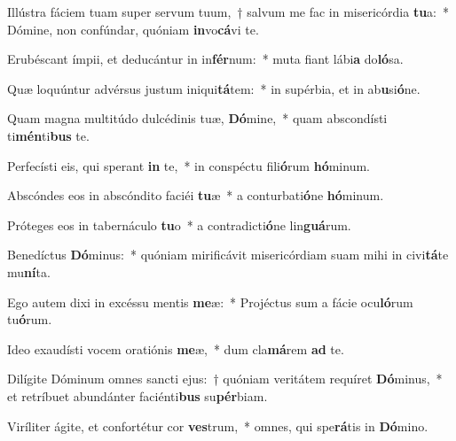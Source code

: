 \item Illústra fáciem tuam super servum tuum,~† salvum me fac in misericórdia \textbf{tu}a:~* Dómine, non confúndar, quóniam \textbf{in}vo\textbf{cá}vi te.
\item Erubéscant ímpii, et deducántur in in\textbf{fér}num:~* muta fiant lábi\textbf{a} do\textbf{ló}sa.
\item Quæ loquúntur advérsus justum iniqui\textbf{tá}tem:~* in supérbia, et in ab\textbf{u}si\textbf{ó}ne.
\item Quam magna multitúdo dulcédinis tuæ, \textbf{Dó}mine,~* quam abscondísti ti\textbf{mén}ti\textbf{bus} te.
\item Perfecísti eis, qui sperant \textbf{in} te,~* in conspéctu fili\textbf{ó}rum \textbf{hó}minum.
\item Abscóndes eos in abscóndito faciéi \textbf{tu}æ~* a conturbati\textbf{ó}ne \textbf{hó}minum.
\item Próteges eos in tabernáculo \textbf{tu}o~* a contradicti\textbf{ó}ne lin\textbf{guá}rum.
\item Benedíctus \textbf{Dó}minus:~* quóniam mirificávit misericórdiam suam mihi in civi\textbf{tá}te mu\textbf{ní}ta.
\item Ego autem dixi in excéssu mentis \textbf{me}æ:~* Projéctus sum a fácie ocu\textbf{ló}rum tu\textbf{ó}rum.
\item Ideo exaudísti vocem oratiónis \textbf{me}æ,~* dum cla\textbf{má}rem \textbf{ad} te.
\item Dilígite Dóminum omnes sancti ejus:~† quóniam veritátem requíret \textbf{Dó}minus,~* et retríbuet abundánter faciénti\textbf{bus} su\textbf{pér}biam.
\item Viríliter ágite, et confortétur cor \textbf{ves}trum,~* omnes, qui spe\textbf{rá}tis in \textbf{Dó}mino.
